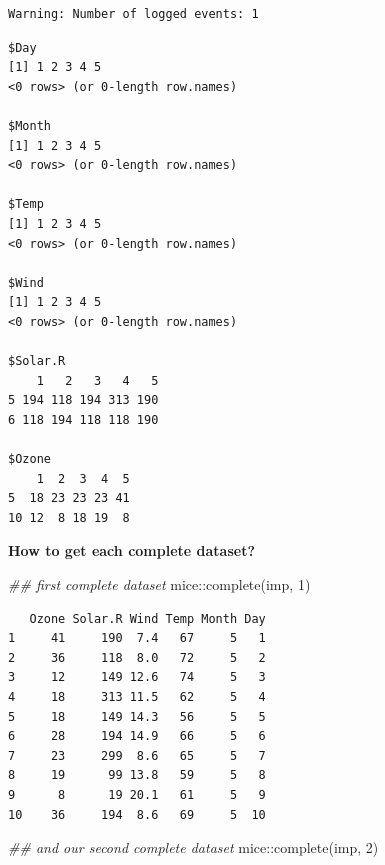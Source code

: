 \documentclass[
  letterpaper,
  DIV=11,
  numbers=noendperiod]{scrreprt}
\newenvironment{Shaded}{}{}
\newcommand{\DecValTok}[1]{\textcolor[rgb]{0.25,0.63,0.44}{#1}}
\newcommand{\DocumentationTok}[1]{\textcolor[rgb]{0.73,0.13,0.13}{\textit{#1}}}
\newcommand{\FunctionTok}[1]{\textcolor[rgb]{0.02,0.16,0.49}{#1}}
\newcommand{\NormalTok}[1]{#1}
\newcommand{\SpecialCharTok}[1]{\textcolor[rgb]{0.25,0.44,0.63}{#1}}
\begin{document}
\begin{verbatim}
Warning: Number of logged events: 1
\end{verbatim}

\begin{Shaded}
\end{Shaded}

\begin{verbatim}
$Day
[1] 1 2 3 4 5
<0 rows> (or 0-length row.names)

$Month
[1] 1 2 3 4 5
<0 rows> (or 0-length row.names)

$Temp
[1] 1 2 3 4 5
<0 rows> (or 0-length row.names)

$Wind
[1] 1 2 3 4 5
<0 rows> (or 0-length row.names)

$Solar.R
    1   2   3   4   5
5 194 118 194 313 190
6 118 194 118 118 190

$Ozone
    1  2  3  4  5
5  18 23 23 23 41
10 12  8 18 19  8
\end{verbatim}

\textbf{How to get each complete dataset?}

\begin{Shaded}
\begin{Highlighting}[]
\DocumentationTok{\#\# first complete dataset }
\NormalTok{  mice}\SpecialCharTok{::}\FunctionTok{complete}\NormalTok{(imp, }\DecValTok{1}\NormalTok{)}
\end{Highlighting}
\end{Shaded}

\begin{verbatim}
   Ozone Solar.R Wind Temp Month Day
1     41     190  7.4   67     5   1
2     36     118  8.0   72     5   2
3     12     149 12.6   74     5   3
4     18     313 11.5   62     5   4
5     18     149 14.3   56     5   5
6     28     194 14.9   66     5   6
7     23     299  8.6   65     5   7
8     19      99 13.8   59     5   8
9      8      19 20.1   61     5   9
10    36     194  8.6   69     5  10
\end{verbatim}

\begin{Shaded}
\begin{Highlighting}[]
\DocumentationTok{\#\# and our second complete dataset}
\NormalTok{  mice}\SpecialCharTok{::}\FunctionTok{complete}\NormalTok{(imp, }\DecValTok{2}\NormalTok{)}
\end{Highlighting}
\end{Shaded}
\end{document}
